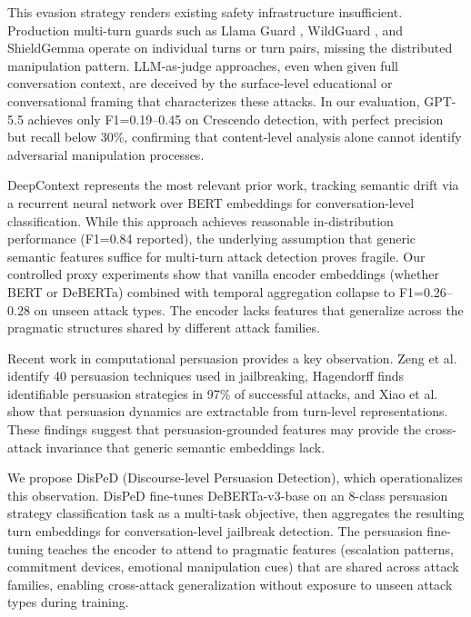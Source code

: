 \documentclass[11pt,a4paper]{article}
\newcommand{\ours}{DisPeD}
\begin{document}
This evasion strategy renders existing safety infrastructure insufficient. Production multi-turn guards such as Llama Guard \cite{llamaguard2024}, WildGuard \cite{wildguard2024}, and ShieldGemma \cite{shieldgemma2024} operate on individual turns or turn pairs, missing the distributed manipulation pattern. LLM-as-judge approaches, even when given full conversation context, are deceived by the surface-level educational or conversational framing that characterizes these attacks. In our evaluation, GPT-5.5 achieves only F1=0.19--0.45 on Crescendo detection, with perfect precision but recall below 30\%, confirming that content-level analysis alone cannot identify adversarial manipulation processes.

DeepContext \cite{su2026deepcontext} represents the most relevant prior work, tracking semantic drift via a recurrent neural network over BERT embeddings for conversation-level classification. While this approach achieves reasonable in-distribution performance (F1=0.84 reported), the underlying assumption that generic semantic features suffice for multi-turn attack detection proves fragile. Our controlled proxy experiments show that vanilla encoder embeddings (whether BERT or DeBERTa) combined with temporal aggregation collapse to F1=0.26--0.28 on unseen attack types. The encoder lacks features that generalize across the pragmatic structures shared by different attack families.

Recent work in computational persuasion provides a key observation. Zeng et al.~\cite{zeng2024pap} identify 40 persuasion techniques used in jailbreaking, Hagendorff \cite{hagendorff2026} finds identifiable persuasion strategies in 97\% of successful attacks, and Xiao et al.~\cite{xiao2025howdollms} show that persuasion dynamics are extractable from turn-level representations. These findings suggest that persuasion-grounded features may provide the cross-attack invariance that generic semantic embeddings lack.

We propose \ours{} (Discourse-level Persuasion Detection), which operationalizes this observation. \ours{} fine-tunes DeBERTa-v3-base on an 8-class persuasion strategy classification task as a multi-task objective, then aggregates the resulting turn embeddings for conversation-level jailbreak detection. The persuasion fine-tuning teaches the encoder to attend to pragmatic features (escalation patterns, commitment devices, emotional manipulation cues) that are shared across attack families, enabling cross-attack generalization without exposure to unseen attack types during training.
\end{document}
